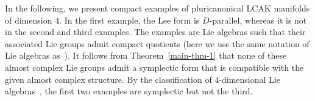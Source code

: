 \documentclass[a4paper,11pt]{amsart}
\theoremstyle{definition}
\renewcommand{\[}{\begin{equation*}}
\renewcommand{\]}{\end{equation*}}
\begin{document}
In the following, we present compact examples of pluricanonical LCAK manifolds of dimension $4$. In the first example, the Lee form is $D$-parallel, whereas it is not in the second and third examples. The examples are Lie algebras such that their associated Lie groups admit compact quotients (here we use the same notation of Lie algebras as~\cite{MR404362}).
It follows from Theorem~\ref{main-thm-1} that none
of these almost complex Lie groups admit a symplectic form that is compatible with the given almost complex structure. By the classification of $4$-dimensional Lie algebras~\cite{MR2307912}, the first two examples are symplectic but not the third. 
\end{document}
